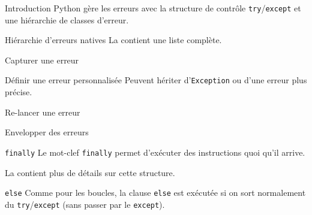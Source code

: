\begin{frame}{Introduction}
  Python gère les erreurs avec la structure de contrôle \texttt{try}/\texttt{except} et une hiérarchie de classes d'erreur.
\end{frame}

\begin{frame}{Hiérarchie d'erreurs natives}
  La  contient une liste complète.
\end{frame}

\begin{frame}{Capturer une erreur}
\end{frame}

\begin{frame}{Définir une erreur personnalisée}
  Peuvent hériter d'\texttt{Exception} ou d'une erreur plus précise.
\end{frame}

\begin{frame}{Re-lancer une erreur}
\end{frame}

\begin{frame}{Envelopper des erreurs}
\end{frame}

\begin{frame}{\texttt{finally}}
  Le mot-clef \texttt{finally} permet d'exécuter des instructions quoi qu'il arrive.

  La  contient plus de détails sur cette structure.

\end{frame}

\begin{frame}{\texttt{else}}
  Comme pour les boucles, la clause \texttt{else} est exécutée si on sort normalement du \texttt{try}/\texttt{except} (sans passer par le \texttt{except}).
\end{frame}
